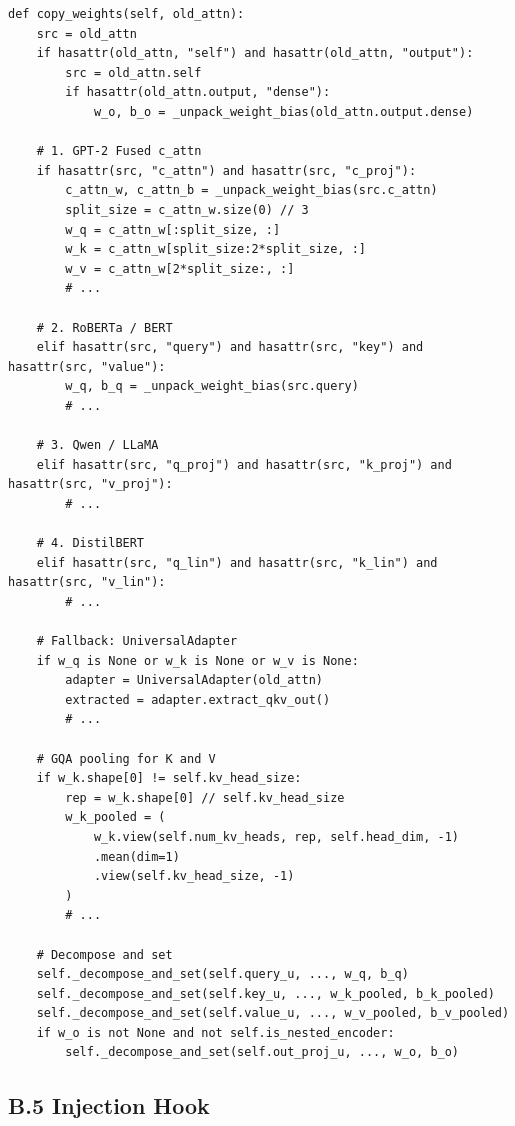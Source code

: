 \begin{lstlisting}
def copy_weights(self, old_attn):
    src = old_attn
    if hasattr(old_attn, "self") and hasattr(old_attn, "output"):
        src = old_attn.self
        if hasattr(old_attn.output, "dense"):
            w_o, b_o = _unpack_weight_bias(old_attn.output.dense)
    
    # 1. GPT-2 Fused c_attn
    if hasattr(src, "c_attn") and hasattr(src, "c_proj"):
        c_attn_w, c_attn_b = _unpack_weight_bias(src.c_attn)
        split_size = c_attn_w.size(0) // 3
        w_q = c_attn_w[:split_size, :]
        w_k = c_attn_w[split_size:2*split_size, :]
        w_v = c_attn_w[2*split_size:, :]
        # ...
    
    # 2. RoBERTa / BERT
    elif hasattr(src, "query") and hasattr(src, "key") and hasattr(src, "value"):
        w_q, b_q = _unpack_weight_bias(src.query)
        # ...
    
    # 3. Qwen / LLaMA
    elif hasattr(src, "q_proj") and hasattr(src, "k_proj") and hasattr(src, "v_proj"):
        # ...
    
    # 4. DistilBERT
    elif hasattr(src, "q_lin") and hasattr(src, "k_lin") and hasattr(src, "v_lin"):
        # ...
    
    # Fallback: UniversalAdapter
    if w_q is None or w_k is None or w_v is None:
        adapter = UniversalAdapter(old_attn)
        extracted = adapter.extract_qkv_out()
        # ...
    
    # GQA pooling for K and V
    if w_k.shape[0] != self.kv_head_size:
        rep = w_k.shape[0] // self.kv_head_size
        w_k_pooled = (
            w_k.view(self.num_kv_heads, rep, self.head_dim, -1)
            .mean(dim=1)
            .view(self.kv_head_size, -1)
        )
        # ...
    
    # Decompose and set
    self._decompose_and_set(self.query_u, ..., w_q, b_q)
    self._decompose_and_set(self.key_u, ..., w_k_pooled, b_k_pooled)
    self._decompose_and_set(self.value_u, ..., w_v_pooled, b_v_pooled)
    if w_o is not None and not self.is_nested_encoder:
        self._decompose_and_set(self.out_proj_u, ..., w_o, b_o)
\end{lstlisting}

\subsection{B.5 Injection Hook}

